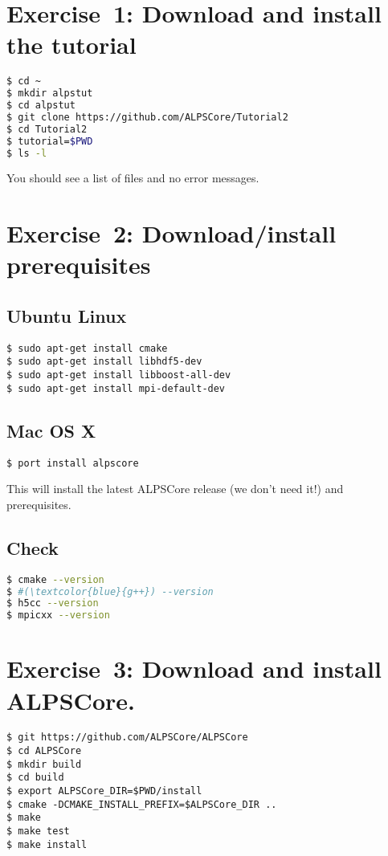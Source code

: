 \documentclass[12pt]{article}
\begin{document}
\section{Exercise~1: Download and install\\ the tutorial}

\begin{lstlisting}[language=sh,emph={ls,cd,mkdir,git}]
$ cd ~
$ mkdir alpstut
$ cd alpstut
$ git clone https://github.com/ALPSCore/Tutorial2
$ cd Tutorial2
$ tutorial=$PWD
$ ls -l
\end{lstlisting}

You should see a list of files and no error messages.

\section{Exercise~2: Download/install prerequisites}
\subsection{Ubuntu Linux}
\begin{lstlisting}[emph={sudo,apt,get}]
$ sudo apt-get install cmake
$ sudo apt-get install libhdf5-dev
$ sudo apt-get install libboost-all-dev
$ sudo apt-get install mpi-default-dev
\end{lstlisting}%
\subsection{Mac OS X}
\begin{lstlisting}[emph={port}]
$ port install alpscore
\end{lstlisting}%
This will install the latest ALPSCore release (we don't need it!)
and prerequisites.

\subsection{Check}
\begin{lstlisting}[language=sh,basicstyle=\ttfamily\small,emph={cmake,gcc,h5cc,mpicxx}]
$ cmake --version
$ #(\textcolor{blue}{g++}) --version
$ h5cc --version
$ mpicxx --version
\end{lstlisting}

\section{Exercise~3: Download and install ALPSCore.}
\begin{lstlisting}[emph={git,export,cmake,make,cd,mkdir}]
$ git https://github.com/ALPSCore/ALPSCore
$ cd ALPSCore
$ mkdir build
$ cd build
$ export ALPSCore_DIR=$PWD/install
$ cmake -DCMAKE_INSTALL_PREFIX=$ALPSCore_DIR ..
$ make
$ make test
$ make install
\end{lstlisting}%
\end{document}
